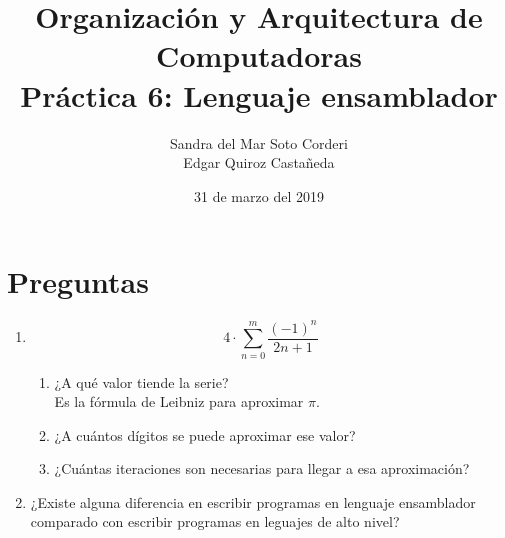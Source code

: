 \documentclass{article}
\begin{document}
    \title{
        Organización y Arquitectura de Computadoras \\
        Práctica 6: Lenguaje ensamblador \\
    }
    \date{
        31 de marzo del 2019
    }
    \author{
        Sandra del Mar Soto Corderi \\
        Edgar Quiroz Castañeda
    }
    \maketitle

    \section{Preguntas}
    \begin{enumerate}
        \item {
            \[4\cdot\sum_{n=0}^{m}{\frac{(-1)^{n}}{2n+1}}\]
            \begin{enumerate}
                \item ¿A qué valor tiende la serie?\\
                Es la fórmula de Leibniz\cite{wolfram pi} para aproximar $\pi$.
                \item ¿A cuántos dígitos se puede aproximar ese valor?
                \item ¿Cuántas iteraciones son necesarias para llegar a esa
                aproximación?
            \end{enumerate}
        }
        \item ¿Existe alguna diferencia en escribir programas en lenguaje 
        ensamblador comparado con escribir programas en leguajes de alto nivel?\\

\end{enumerate}
\end{document}
